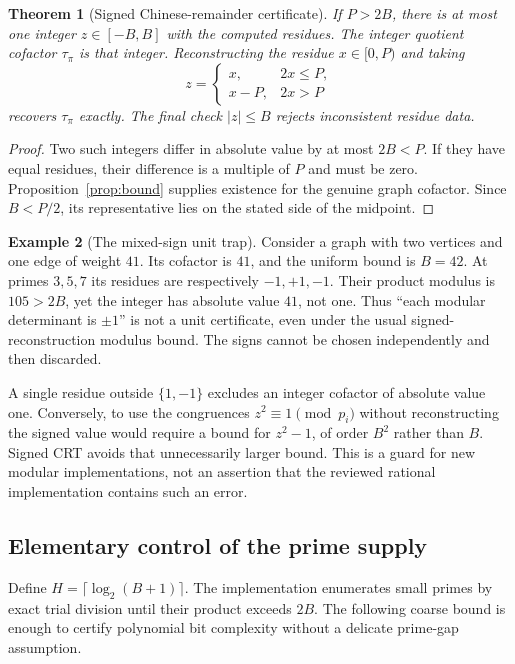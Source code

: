 \documentclass[11pt,letterpaper]{article}
\newtheorem{theorem}{Theorem}[section]
\theoremstyle{definition}\newtheorem{definition}[theorem]{Definition}
\newtheorem{example}[theorem]{Example}
\theoremstyle{remark}\newtheorem{remark}[theorem]{Remark}
\begin{document}
\begin{theorem}[Signed Chinese-remainder certificate]
\label{thm:crt}
If $P>2B$, there is at most one integer $z\in[-B,B]$ with the computed residues. The integer quotient cofactor $\tau_\pi$ is that integer. Reconstructing the residue $x\in[0,P)$ and taking
\[
 z=\begin{cases}x,&2x\leq P,\\x-P,&2x>P\end{cases}
\]
recovers $\tau_\pi$ exactly. The final check $|z|\leq B$ rejects inconsistent residue data.
\end{theorem}
\begin{proof}
Two such integers differ in absolute value by at most $2B<P$. If they have equal residues, their difference is a multiple of $P$ and must be zero. Proposition~\ref{prop:bound} supplies existence for the genuine graph cofactor. Since $B<P/2$, its representative lies on the stated side of the midpoint.
\end{proof}

\begin{example}[The mixed-sign unit trap]
Consider a graph with two vertices and one edge of weight $41$. Its cofactor is $41$, and the uniform bound is $B=42$. At primes $3,5,7$ its residues are respectively $-1,+1,-1$. Their product modulus is $105>2B$, yet the integer has absolute value $41$, not one. Thus ``each modular determinant is $\pm1$'' is not a unit certificate, even under the usual signed-reconstruction modulus bound. The signs cannot be chosen independently and then discarded.
\end{example}

A single residue outside $\{1,-1\}$ excludes an integer cofactor of absolute value one. Conversely, to use the congruences $z^2\equiv1\pmod{p_i}$ without reconstructing the signed value would require a bound for $z^2-1$, of order $B^2$ rather than $B$. Signed CRT avoids that unnecessarily larger bound. This is a guard for new modular implementations, not an assertion that the reviewed rational implementation contains such an error.

\subsection{Elementary control of the prime supply}
Define $H=\lceil\log_2(B+1)\rceil$. The implementation enumerates small primes by exact trial division until their product exceeds $2B$. The following coarse bound is enough to certify polynomial bit complexity without a delicate prime-gap assumption.
\end{document}
